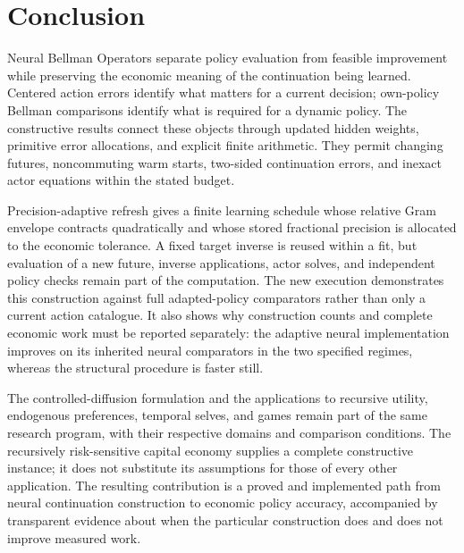 \section{Conclusion}\label{sec:r37conclusion}
Neural Bellman Operators separate policy evaluation from feasible improvement
while preserving the economic meaning of the continuation being learned.
Centered action errors identify what matters for a current decision;
own-policy Bellman comparisons identify what is required for a dynamic
policy. The constructive results connect these objects through updated
hidden weights, primitive error allocations, and explicit finite arithmetic.
They permit changing futures, noncommuting warm starts, two-sided
continuation errors, and inexact actor equations within the stated budget.

Precision-adaptive refresh gives a finite learning schedule whose relative
Gram envelope contracts quadratically and whose stored fractional precision
is allocated to the economic tolerance. A fixed target inverse is reused
within a fit, but evaluation of a new future, inverse applications, actor
solves, and independent policy checks remain part of the computation. The
new execution demonstrates this construction against full adapted-policy
comparators rather than only a current action catalogue. It also shows why
construction counts and complete economic work must be reported separately:
the adaptive neural implementation improves on its inherited neural
comparators in the two specified regimes, whereas the structural procedure
is faster still.

The controlled-diffusion formulation and the applications to recursive
utility, endogenous preferences, temporal selves, and games remain part of
the same research program, with their respective domains and comparison
conditions. The recursively risk-sensitive capital economy supplies a
complete constructive instance; it does not substitute its assumptions for
those of every other application. The resulting contribution is a proved
and implemented path from neural continuation construction to economic
policy accuracy, accompanied by transparent evidence about when the
particular construction does and does not improve measured work.
